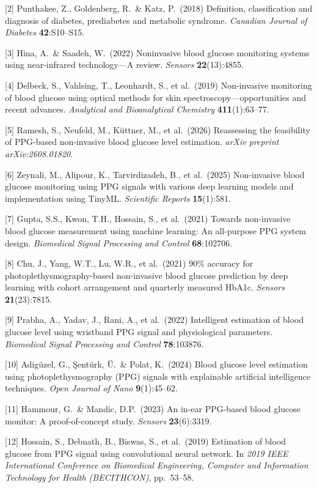 \documentclass{article}
\begin{document}
[2] Punthakee, Z., Goldenberg, R.\ \& Katz, P.\ (2018)
Definition, classification and diagnosis of diabetes, prediabetes and metabolic syndrome.
{\it Canadian Journal of Diabetes} {\bf 42}:S10--S15.

[3] Hina, A.\ \& Saadeh, W.\ (2022)
Noninvasive blood glucose monitoring systems using near-infrared technology---A review.
{\it Sensors} {\bf 22}(13):4855.

[4] Delbeck, S., Vahlsing, T., Leonhardt, S., et al.\ (2019)
Non-invasive monitoring of blood glucose using optical methods for skin spectroscopy---opportunities and recent advances.
{\it Analytical and Bioanalytical Chemistry} {\bf 411}(1):63--77.

[5] Ramesh, S., Neufeld, M., Küttner, M., et al.\ (2026)
Reassessing the feasibility of PPG-based non-invasive blood glucose level estimation.
{\it arXiv preprint arXiv:2608.01820}.

[6] Zeynali, M., Alipour, K., Tarvirdizadeh, B., et al.\ (2025)
Non-invasive blood glucose monitoring using PPG signals with various deep learning models and implementation using TinyML.
{\it Scientific Reports} {\bf 15}(1):581.

[7] Gupta, S.S., Kwon, T.H., Hossain, S., et al.\ (2021)
Towards non-invasive blood glucose measurement using machine learning: An all-purpose PPG system design.
{\it Biomedical Signal Processing and Control} {\bf 68}:102706.

[8] Chu, J., Yang, W.T., Lu, W.R., et al.\ (2021)
90\% accuracy for photoplethysmography-based non-invasive blood glucose prediction by deep learning with cohort arrangement and quarterly measured HbA1c.
{\it Sensors} {\bf 21}(23):7815.

[9] Prabha, A., Yadav, J., Rani, A., et al.\ (2022)
Intelligent estimation of blood glucose level using wristband PPG signal and physiological parameters.
{\it Biomedical Signal Processing and Control} {\bf 78}:103876.

[10] Adigüzel, G., Şentürk, Ü.\ \& Polat, K.\ (2024)
Blood glucose level estimation using photoplethysmography (PPG) signals with explainable artificial intelligence techniques.
{\it Open Journal of Nano} {\bf 9}(1):45--62.

[11] Hammour, G.\ \& Mandic, D.P.\ (2023)
An in-ear PPG-based blood glucose monitor: A proof-of-concept study.
{\it Sensors} {\bf 23}(6):3319.

[12] Hossain, S., Debnath, B., Biswas, S., et al.\ (2019)
Estimation of blood glucose from PPG signal using convolutional neural network.
In {\it 2019 IEEE International Conference on Biomedical Engineering, Computer and Information Technology for Health (BECITHCON)}, pp.\ 53--58.
\end{document}
